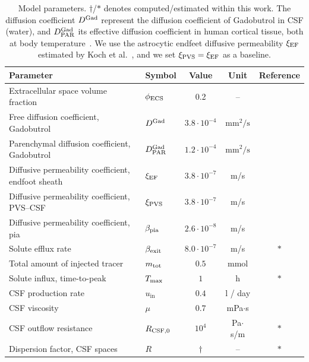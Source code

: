 \documentclass[fleqn,10pt]{wlscirep}
\begin{document}
\begin{table}
  \begin{center}
    \begin{tabular}{ll|ccc}
      \toprule
      Parameter& Symbol & Value & Unit& Reference\\
      \midrule
      Extracellular space volume fraction & $\phi_{\rm ECS}$ & 0.2 & -- & \cite{nicholson1981ion} \\
      Free diffusion coefficient, Gadobutrol & $D^{\rm Gad}$ & $3.8 \cdot 10^{-4}$& $\text{mm}^2/\text{s}$ & \cite{valnes2020apparent}\\
      Parenchymal diffusion coefficient, Gadobutrol & $D^{\rm Gad}_{\rm PAR}$ & $1.2 \cdot 10^{-4}$ & $\text{mm}^2/\text{s}$  & \cite{hornkjol2022csf} \\
      Diffusive permeability coefficient, endfoot sheath & $\xi_{\rm EF}$ & $3.8\cdot 10^{-7}$  & m/s & \cite{koch2023estimates} \\
      Diffusive permeability coefficient, PVS--CSF & $\xi_{\rm PVS}$ & $3.8\cdot 10^{-7}$  & m/s & \cite{koch2023estimates} \\
      Diffusive permeability coefficient, pia & $\beta_{\rm pia}$ & $2.6 \cdot 10^{-8}$ & m/s & \cite{riseth2025twocompartment} \\
      Solute efflux rate & $\beta_{\rm exit}$ & $8.0 \cdot 10^{-7}$ & m/s & $\ast$ \\
      Total amount of injected tracer & $m_{\rm tot}$ & $0.5$ & mmol & \cite{eide2024functional} \\
      Solute influx, time-to-peak & $T_{\rm max}$ & $1$ & h & $\ast$ \\
      CSF production rate & $u_{\mathrm{in}}$ & $0.4$  & l / day & \cite{nilsson1992circadian} \\
      CSF viscosity & $\mu$ & $0.7$ & mPa$ \cdot $s & \cite{bloomfield1998effects} \\ 
      CSF outflow resistance & $R_{\rm CSF, 0}$ & $10^{4}$  & Pa$\cdot$s/m & $\ast$ \\ 
      Dispersion factor, CSF spaces & $R$ & $\dagger$ & -- & $\ast$ \\
      \bottomrule
    \end{tabular}
  \end{center}
  \caption{Model parameters. $\dagger$/$\ast$ denotes
    computed/estimated within this work. The diffusion coefficient
    $D^{\rm Gad}$ represent the diffusion coefficient of Gadobutrol in
    CSF (water), and $D^{\rm Gad}_{\rm PAR}$ its effective diffusion
    coefficient in human cortical tissue, both at body
    temperature~\cite{sykova2008diffusion, valnes2020apparent,
      hornkjol2022csf}. We use the astrocytic endfeet diffusive permeability
    $\xi_{\rm EF}$ estimated by Koch et al.~\cite{koch2023estimates},
    and we set $\xi_{\rm PVS} = \xi_{\rm EF}$ as a baseline.}
  \label{tab:parameters}
\end{table}
\end{document}
